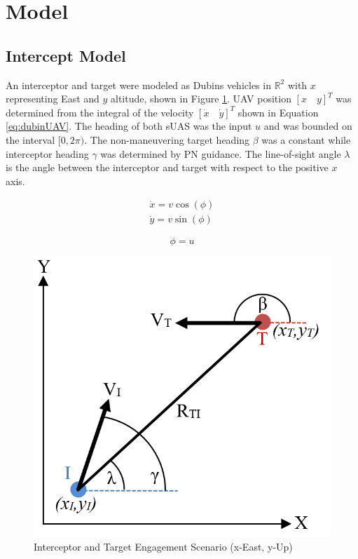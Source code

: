\documentclass[conference]{IEEEtran}
\begin{document}

\section{Model}

\subsection{Intercept Model}
An interceptor and target were modeled as Dubins vehicles in $\mathbb{R}^2$ with $x$ representing East and $y$ altitude, shown in Figure \ref{fig:Egagement}. UAV position $[x \quad y]^T$ was determined from the integral of the velocity $[\dot{x} \quad \dot{y}]^T$ shown in Equation \ref{eq:dubinUAV}. The heading of both sUAS was the input $u$ and was bounded on the interval $[0,2\pi)$. The non-maneuvering target heading $\beta$ was a constant while interceptor heading $\gamma$ was determined by PN guidance. The line-of-sight angle $\lambda$ is the angle between the interceptor and target with respect to the positive $x$ axis. 



\begin{equation} \label{eq:dubinUAV}
\begin{split}
\dot{x} = v\cos(\phi)\\
\dot{y} = v\sin(\phi)
\end{split}
\end{equation}

\begin{equation}\label{eq:dubinsVel}
\phi = u
\end{equation}
 

\begin{figure}[H]
	\centering
	\includegraphics[width=6 cm]{Engagement_Model.PNG}
	\caption{Interceptor and Target Engagement Scenario (x-East, y-Up)}
	\label{fig:Egagement}
\end{figure}
\end{document}
